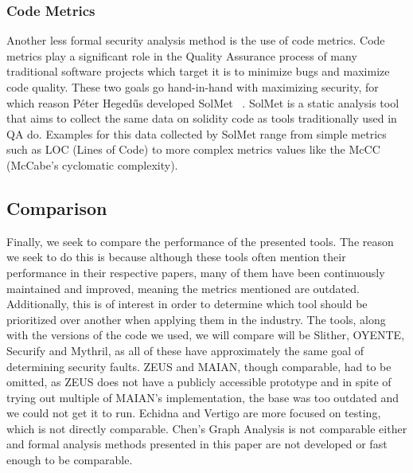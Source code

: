 \documentclass[letterpaper,twocolumn,10pt]{article}
\begin{document}
\subsubsection{Code Metrics}
Another less formal security analysis method is the use of code metrics. Code metrics play a significant role in the Quality Assurance process of many traditional software projects which target it is to minimize bugs and maximize code quality. These two goals go hand-in-hand with maximizing security, for which reason Péter Hegedűs developed SolMet ~\cite{hegedűs_2019}. SolMet is a static analysis tool that aims to collect the same data on solidity code as tools traditionally used in QA do. Examples for this data collected by SolMet range from simple metrics such as LOC (Lines of Code) to more complex metrics values like the McCC (McCabe’s cyclomatic complexity).

\subsection{Comparison}
Finally, we seek to compare the performance of the presented tools. The reason we seek to do this is because although these tools often mention their performance in their respective papers, many of them have been continuously maintained and improved, meaning the metrics mentioned are outdated. Additionally, this is of interest in order to determine which tool should be prioritized over another when applying them in the industry. The tools, along with the versions of the code we used, we will compare will be Slither\cite{Slither}, OYENTE\cite{oyente}, Securify\cite{securify} and Mythril\cite{mythril}, as all of these have approximately the same goal of determining security faults. ZEUS and MAIAN, though comparable, had to be omitted, as ZEUS does not have a publicly accessible prototype and in spite of trying out multiple of MAIAN's implementation, the base was too outdated and we could not get it to run.
Echidna and Vertigo are more focused on testing, which is not directly comparable. Chen's Graph Analysis is not comparable either and formal analysis methods presented in this paper are not developed or fast enough to be comparable.
\end{document}
